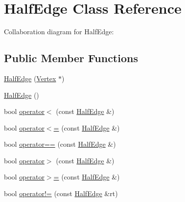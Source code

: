 \hypertarget{classHalfEdge}{}\section{Half\+Edge Class Reference}
\label{classHalfEdge}


Collaboration diagram for Half\+Edge\+:
\subsection*{Public Member Functions}
\begin{DoxyCompactItemize}
\item 
\hyperlink{classHalfEdge_af73e9a2bacfdc231be1fa45f8d1dc485}{Half\+Edge} (\hyperlink{classVertex}{Vertex} $\ast$)
\item 
\hyperlink{classHalfEdge_a9694f1dbddb8e3017ab75f5156d11da3}{Half\+Edge} ()
\item 
bool \hyperlink{classHalfEdge_afb0ef384d71a04d25a58a213b9ffba1f}{operator$<$} (const \hyperlink{classHalfEdge}{Half\+Edge} \&)
\item 
bool \hyperlink{classHalfEdge_ae43f49e340b90716c49cd11416085be8}{operator$<$=} (const \hyperlink{classHalfEdge}{Half\+Edge} \&)
\item 
bool \hyperlink{classHalfEdge_a8cb799e2e7e7e1db7b10c21f0f34dbb4}{operator==} (const \hyperlink{classHalfEdge}{Half\+Edge} \&)
\item 
bool \hyperlink{classHalfEdge_afd3c758041d7673381ee3382550b9a8d}{operator$>$} (const \hyperlink{classHalfEdge}{Half\+Edge} \&)
\item 
bool \hyperlink{classHalfEdge_aa59230a3014659a789ac70384f1e2699}{operator$>$=} (const \hyperlink{classHalfEdge}{Half\+Edge} \&)
\item 
bool \hyperlink{classHalfEdge_a45b92efec5d71ed7856b3a8073750047}{operator!=} (const \hyperlink{classHalfEdge}{Half\+Edge} \&rt)
\end{DoxyCompactItemize}
